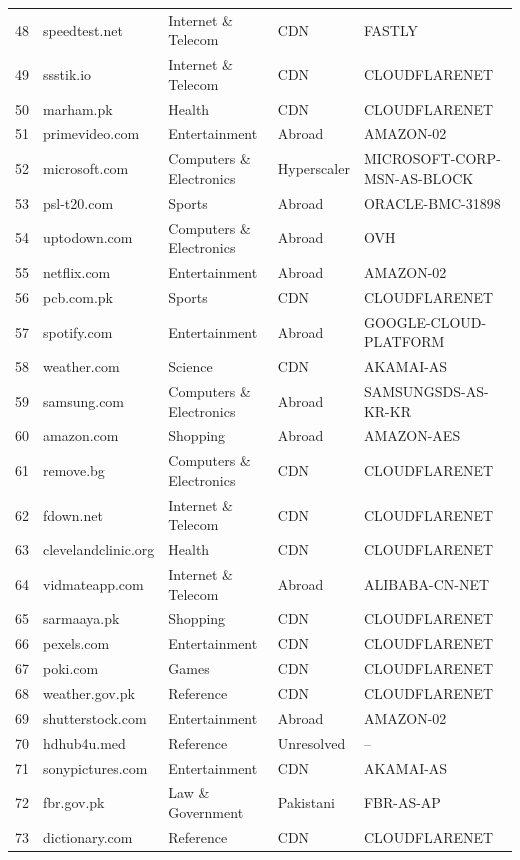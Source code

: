 \documentclass{article}
\begin{document}
\begin{longtable}{r l l l l}
48 & speedtest.net & Internet \& Telecom & CDN & FASTLY \\
49 & ssstik.io & Internet \& Telecom & CDN & CLOUDFLARENET \\
50 & marham.pk & Health & CDN & CLOUDFLARENET \\
51 & primevideo.com & Entertainment & Abroad & AMAZON-02 \\
52 & microsoft.com & Computers \& Electronics & Hyperscaler & MICROSOFT-CORP-MSN-AS-BLOCK \\
53 & psl-t20.com & Sports & Abroad & ORACLE-BMC-31898 \\
54 & uptodown.com & Computers \& Electronics & Abroad & OVH \\
55 & netflix.com & Entertainment & Abroad & AMAZON-02 \\
56 & pcb.com.pk & Sports & CDN & CLOUDFLARENET \\
57 & spotify.com & Entertainment & Abroad & GOOGLE-CLOUD-PLATFORM \\
58 & weather.com & Science & CDN & AKAMAI-AS \\
59 & samsung.com & Computers \& Electronics & Abroad & SAMSUNGSDS-AS-KR-KR \\
60 & amazon.com & Shopping & Abroad & AMAZON-AES \\
61 & remove.bg & Computers \& Electronics & CDN & CLOUDFLARENET \\
62 & fdown.net & Internet \& Telecom & CDN & CLOUDFLARENET \\
63 & clevelandclinic.org & Health & CDN & CLOUDFLARENET \\
64 & vidmateapp.com & Internet \& Telecom & Abroad & ALIBABA-CN-NET \\
65 & sarmaaya.pk & Shopping & CDN & CLOUDFLARENET \\
66 & pexels.com & Entertainment & CDN & CLOUDFLARENET \\
67 & poki.com & Games & CDN & CLOUDFLARENET \\
68 & weather.gov.pk & Reference & CDN & CLOUDFLARENET \\
69 & shutterstock.com & Entertainment & Abroad & AMAZON-02 \\
70 & hdhub4u.med & Reference & Unresolved & -- \\
71 & sonypictures.com & Entertainment & CDN & AKAMAI-AS \\
72 & fbr.gov.pk & Law \& Government & Pakistani & FBR-AS-AP \\
73 & dictionary.com & Reference & CDN & CLOUDFLARENET \\

\end{longtable}
\end{document}
